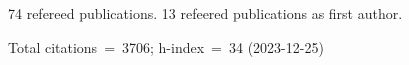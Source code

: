 74 refereed publications. 13 refeered publications as first author.

Total citations~=~3706; h-index~=~34 (2023-12-25)